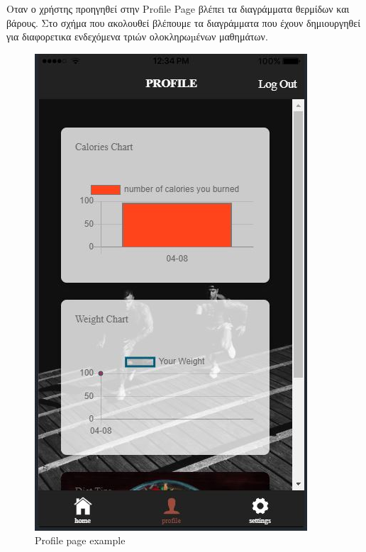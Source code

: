\documentclass[a4paper,12pt]{article}
\begin{document}
		\newpage
		Οταν ο χρήστης προηγηθεί στην Profile Page βλέπει τα διαγράμματα θερμίδων και βάρους. Στο σχήμα που ακολουθεί βλέπουμε τα διαγράμματα που έχουν δημιουργηθεί
		για διαφορετικα ενδεχόμενα τριών ολοκληρωµένων μαθημάτων.
		\vspace*{1cm}
		\begin{figure}[!htb]
			\caption{Profile page example}
			\vspace*{0.5cm}

			  \includegraphics[width=\linewidth]{lesson5}

\end{figure}
\end{document}
